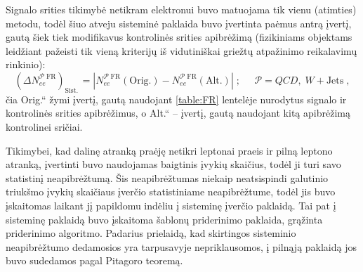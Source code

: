 \documentclass[a4paper, 12pt, oneside]{article}
\newcommand{\WJets}{W\! +\!\mathrm{Jets}}
\newcommand{\ltq}[1]{{\quotedblbase{}#1\textquotedblleft{}}}
\newcommand{\QCD}{QC\! D}
\newlength\q
\begin{document}
Signalo srities tikimybė netikram elektronui buvo matuojama tik vienu (atimties) metodu, todėl šiuo
atveju sisteminė paklaida buvo įvertinta paėmus antrą įvertį, gautą šiek tiek modifikavus kontrolinės srities apibrėžimą
(fizikiniams objektams leidžiant pažeisti tik vieną kriterijų iš vidutiniškai griežtų atpažinimo reikalavimų rinkinio):
\begin{equation}
\label{eq:systUncFRee}
	(\Delta N_{ee}^{\mathcal{P} \; \mathrm{FR}})_{\mathrm{Sist.\,}} =
	\left| N_{ee}^{\mathcal{P} \; \mathrm{FR}}(\mathrm{Orig.}) -
	N_{ee}^{\mathcal{P} \; \mathrm{FR}}(\mathrm{Alt.}) \right| \;  ;
	\;\;\;\;\; \mathcal{P} = \QCD, \; \WJets \; ,
\end{equation}
čia \ltq{Orig.} žymi įvertį, gautą naudojant \ref{table:FR} lentelėje nurodytus signalo ir kontrolinės srities apibrėžimus, 
o \ltq{Alt.} -- įvertį, gautą naudojant kitą apibrėžimą kontrolinei sričiai.

Tikimybei, kad dalinę atranką praėję netikri leptonai praeis ir pilną leptono atranką, įvertinti buvo naudojamas baigtinis
įvykių skaičius, todėl ji turi savo statistinį neapibrėžtumą.
Šis neapibrėžtumas niekaip neatsispindi galutinio triukšmo įvykių skaičiaus įverčio statistiniame neapibrėžtume, todėl
jis buvo įskaitomas laikant jį papildomu indėliu į sisteminę įverčio paklaidą.
Tai pat į sisteminę paklaidą buvo įskaitoma šablonų priderinimo paklaida, grąžinta priderinimo algoritmo.
Padarius prielaidą, kad skirtingos sisteminio neapibrėžtumo dedamosios yra tarpusavyje nepriklausomos, į pilnąją paklaidą jos
buvo sudedamos pagal Pitagoro teoremą.


\newpage
\end{document}
